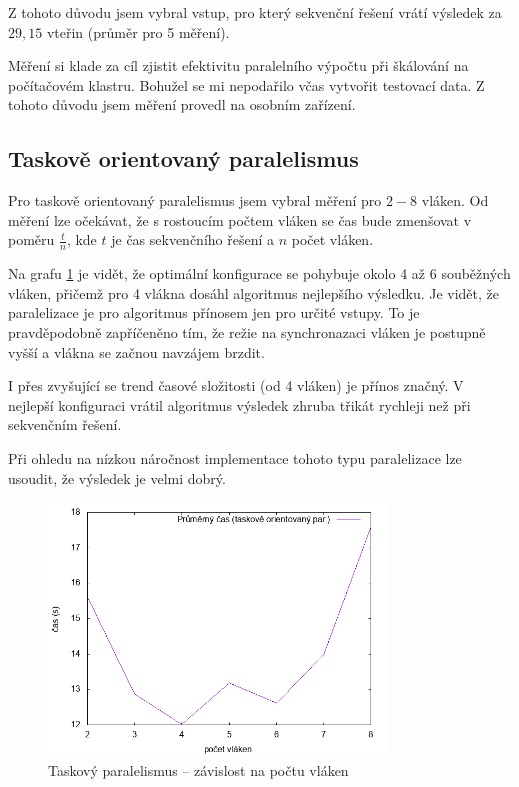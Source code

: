 \documentclass[czech]{article}
\begin{document}
Z tohoto důvodu jsem vybral vstup, pro který sekvenční řešení vrátí výsledek za $29,15$ vteřin (průměr pro 5 měření).

Měření si klade za cíl zjistit efektivitu paralelního výpočtu při škálování na počítačovém klastru.
Bohužel se mi nepodařilo včas vytvořit testovací data.
Z tohoto důvodu jsem měření provedl na osobním zařízení.

\subsection{Taskově orientovaný paralelismus}

Pro taskově orientovaný paralelismus jsem vybral měření pro $2-8$ vláken.
Od měření lze očekávat, že s rostoucím počtem vláken se čas bude zmenšovat v poměru $\frac{t}{n}$, kde $t$ je čas sekvenčního řešení a $n$ počet vláken.

Na grafu \ref{fig:task} je vidět, že optimální konfigurace se pohybuje okolo 4 až 6 souběžných vláken, přičemž pro 4 vlákna dosáhl algoritmus nejlepšího výsledku.
Je vidět, že paralelizace je pro algoritmus přínosem jen pro určité vstupy.
To je pravděpodobně zapříčeněno tím, že režie na synchronazaci vláken je postupně vyšší a vlákna se začnou navzájem brzdit.

I přes zvyšující se trend časové složitosti (od 4 vláken) je přínos značný.
V nejlepší konfiguraci vrátil algoritmus výsledek zhruba třikát rychleji než při sekvenčním řešení.

Při ohledu na nízkou náročnost implementace tohoto typu paralelizace lze usoudit, že výsledek je velmi dobrý.

\begin{figure}[H]
    \centering
    \includegraphics[width=0.8\textwidth]{assets/parallel-task-oriented.png}
    \caption{Taskový paralelismus -- závislost na počtu vláken}
    \label{fig:task}
\end{figure}
\end{document}
